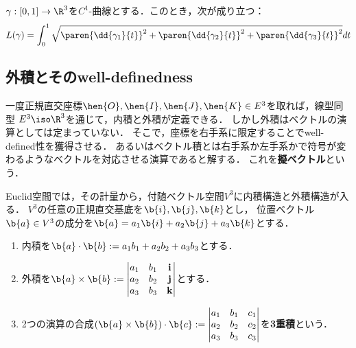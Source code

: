 \documentclass[uplatex,dvipdfmx]{jsreport}
\begin{document}
\begin{theorem}
    $\gamma:[0,1]\to\R^3$を$C^1$-曲線とする．このとき，次が成り立つ：
    \[L(\gamma)=\int^1_0\sqrt{\paren{\dd{\gamma_1}{t}}^2+\paren{\dd{\gamma_2}{t}}^2+\paren{\dd{\gamma_3}{t}}^2}dt\]
\end{theorem}

\subsection{外積とそのwell-definedness}

\begin{tcolorbox}[colframe=ForestGreen, colback=ForestGreen!10!white,breakable,colbacktitle=ForestGreen!40!white,coltitle=black,fonttitle=\bfseries\sffamily,
title=]
    一度正規直交座標$\hen{O},\hen{I},\hen{J},\hen{K}\in E^3$を取れば，線型同型
    $E^3\iso\R^3$を通じて，内積と外積が定義できる．
    しかし外積はベクトルの演算としては定まっていない．
    そこで，座標を右手系に限定することでwell-defined性を獲得させる．
    あるいはベクトル積とは右手系か左手系かで符号が変わるようなベクトルを対応させる演算であると解する．
    これを\textbf{擬ベクトル}という．
\end{tcolorbox}

\begin{definition}[Euclid空間の構造]
    Euclid空間では，その計量から，付随ベクトル空間$V^3$に内積構造と外積構造が入る．
    $V^3$の任意の正規直交基底を$\b{i},\b{j},\b{k}$とし，
    位置ベクトル$\b{a}\in V^3$の成分を$\b{a}=a_1\b{i}+a_2\b{j}+a_3\b{k}$とする．
    \begin{enumerate}
        \item 内積を$\b{a}\cdot \b{b}:=a_1b_1+a_2b_2+a_3b_3$とする．
        \item 外積を$\b{a}\times \b{b}:=\begin{vmatrix}
            a_1&b_1&\bf{i}\\a_2&b_2&\bf{j}\\a_3&b_3&\bf{k}
        \end{vmatrix}$とする．
        \item 2つの演算の合成$(\b{a}\times \b{b})\cdot \b{c}:=\begin{vmatrix}
            a_1&b_1&c_1\\a_2&b_2&c_2\\a_3&b_3&c_3
        \end{vmatrix}$を\textbf{3重積}という．
    \end{enumerate}
\end{definition}
\end{document}
